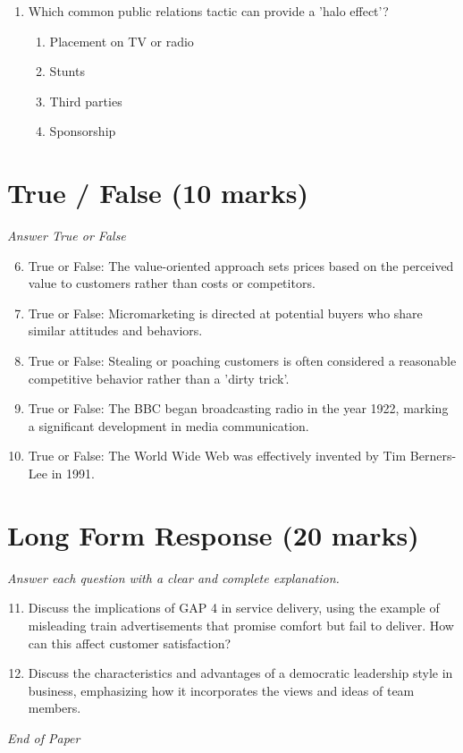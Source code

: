 \documentclass[12pt]{article}
\begin{document}
\begin{enumerate}[label=\arabic*.]
\begin{enumerate}[label=(\alph*)]
    \item Cost leadership.
    \item Differentiation.
    \item Focus strategy.
    \item Market follower strategy.
\end{enumerate}
\item Which common public relations tactic can provide a 'halo effect'?
\begin{enumerate}[label=(\alph*)]
    \item Placement on TV or radio
    \item Stunts
    \item Third parties
    \item Sponsorship
\end{enumerate}
\end{enumerate}

\section*{True / False (10 marks)}
\textit{Answer True or False}
\begin{enumerate}[label=\arabic*.]
\setcounter{enumi}{5}
\item True or False: The value-oriented approach sets prices based on the perceived value to customers rather than costs or competitors.
\item True or False: Micromarketing is directed at potential buyers who share similar attitudes and behaviors.
\item True or False: Stealing or poaching customers is often considered a reasonable competitive behavior rather than a 'dirty trick'.
\item True or False: The BBC began broadcasting radio in the year 1922, marking a significant development in media communication.
\item True or False: The World Wide Web was effectively invented by Tim Berners-Lee in 1991.
\end{enumerate}

\section*{Long Form Response (20 marks)}
\textit{Answer each question with a clear and complete explanation.}
\begin{enumerate}[label=\arabic*.]
\setcounter{enumi}{10}
\item Discuss the implications of GAP 4 in service delivery, using the example of misleading train advertisements that promise comfort but fail to deliver. How can this affect customer satisfaction?
\item Discuss the characteristics and advantages of a democratic leadership style in business, emphasizing how it incorporates the views and ideas of team members.
\end{enumerate}

\vfill
\noindent\textit{End of Paper}
\end{document}
